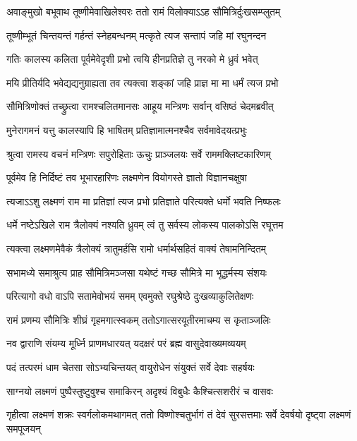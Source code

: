 \twolineshloka
{अवाङ्मुखो बभूवाथ तूष्णीमेवाखिलेश्वरः}
{ततो रामं विलोक्याऽऽह सौमित्रिर्दुःखसम्प्लुतम्} %

\twolineshloka
{तूष्णीम्भूतं चिन्तयन्तं गर्हन्तं स्नेहबन्धनम्}
{मत्कृते त्यज सन्तापं जहि मां रघुनन्दन} %

\twolineshloka
{गतिः कालस्य कलिता पूर्वमेवेदृशी प्रभो}
{त्वयि हीनप्रतिज्ञे तु नरको मे ध्रुवं भवेत्} %

\twolineshloka
{मयि प्रीतिर्यदि भवेद्यद्यनुग्राह्यता तव}
{त्यक्त्वा शङ्कां जहि प्राज्ञ मा मा धर्मं त्यज प्रभो} %

\twolineshloka
{सौमित्रिणोक्तं तच्छ्रुत्वा रामश्चलितमानसः}
{आहूय मन्त्रिणः सर्वान् वसिष्ठं चेदमब्रवीत्} %

\twolineshloka
{मुनेरागमनं यत्तु कालस्यापि हि भाषितम्}
{प्रतिज्ञामात्मनश्चैव सर्वमावेदयत्प्रभुः} %

\twolineshloka
{श्रुत्वा रामस्य वचनं मन्त्रिणः सपुरोहिताः}
{ऊचुः प्राञ्जलयः सर्वे राममक्लिष्टकारिणम्} %

\twolineshloka
{पूर्वमेव हि निर्दिष्टं तव भूभारहारिणः}
{लक्ष्मणेन वियोगस्ते ज्ञातो विज्ञानचक्षुषा} %

\twolineshloka
{त्यजाऽऽशु लक्ष्मणं राम मा प्रतिज्ञां त्यज प्रभो}
{प्रतिज्ञाते परित्यक्ते धर्मो भवति निष्फलः} %

\twolineshloka
{धर्मे नष्टेऽखिले राम त्रैलोक्यं नश्यति ध्रुवम्}
{त्वं तु सर्वस्य लोकस्य पालकोऽसि रघूत्तम} %

\twolineshloka
{त्यक्त्वा लक्ष्मणमेवैकं त्रैलोक्यं त्रातुमर्हसि}
{रामो धर्मार्थसहितं वाक्यं तेषामनिन्दितम्} %

\twolineshloka
{सभामध्ये समाश्रुत्य प्राह सौमित्रिमञ्जसा}
{यथेष्टं गच्छ सौमित्रे मा भूद्धर्मस्य संशयः} %

\twolineshloka
{परित्यागो वधो वाऽपि सतामेवोभयं समम्}
{एवमुक्ते रघुश्रेष्ठे दुःखव्याकुलितेक्षणः} %

\twolineshloka
{रामं प्रणम्य सौमित्रिः शीघ्रं गृहमगात्स्वकम्}
{ततोऽगात्सरयूतीरमाचम्य स कृताञ्जलिः} %

\twolineshloka
{नव द्वाराणि संयम्य मूर्ध्नि प्राणमधारयत्}
{यदक्षरं परं ब्रह्म वासुदेवाख्यमव्ययम्} %

\twolineshloka
{पदं तत्परमं धाम चेतसा सोऽभ्यचिन्तयत्}
{वायुरोधेन संयुक्तं सर्वे देवाः सहर्षयः} %

\twolineshloka
{साग्नयो लक्ष्मणं पुष्पैस्तुष्टुवुश्च समाकिरन्}
{अदृश्यं विबुधैः कैश्चित्सशरीरं च वासवः} %

\threelineshloka
{गृहीत्वा लक्ष्मणं शक्रः स्वर्गलोकमथागमत्}
{ततो विष्णोश्चतुर्भागं तं देवं सुरसत्तमाः}
{सर्वे देवर्षयो दृष्ट्वा लक्ष्मणं समपूजयन्} %

